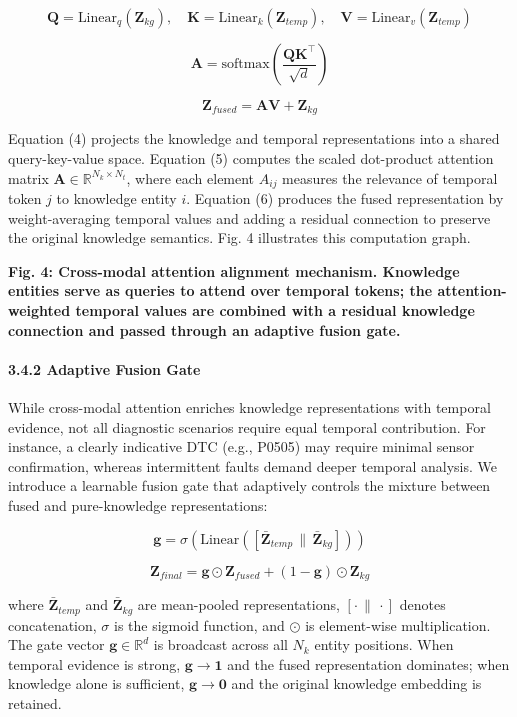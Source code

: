 \documentclass[
  11pt,
]{article}
\begin{document}
\[ \mathbf{Q} = \text{Linear}_q(\mathbf{Z}_{kg}), \quad \mathbf{K} = \text{Linear}_k(\mathbf{Z}_{temp}), \quad \mathbf{V} = \text{Linear}_v(\mathbf{Z}_{temp}) \tag{4} \]

\[ \mathbf{A} = \text{softmax}\left(\frac{\mathbf{Q}\mathbf{K}^\top}{\sqrt{d}}\right) \tag{5} \]

\[ \mathbf{Z}_{fused} = \mathbf{A}\mathbf{V} + \mathbf{Z}_{kg} \tag{6} \]

Equation (4) projects the knowledge and temporal representations into a
shared query-key-value space. Equation (5) computes the scaled
dot-product attention matrix
\(\mathbf{A} \in \mathbb{R}^{N_k \times N_t}\), where each element
\(A_{ij}\) measures the relevance of temporal token \(j\) to knowledge
entity \(i\). Equation (6) produces the fused representation by
weight-averaging temporal values and adding a residual connection to
preserve the original knowledge semantics. Fig. 4 illustrates this
computation graph.

\textbf{Fig. 4: Cross-modal attention alignment mechanism. Knowledge
entities serve as queries to attend over temporal tokens; the
attention-weighted temporal values are combined with a residual
knowledge connection and passed through an adaptive fusion gate.}

\paragraph{3.4.2 Adaptive Fusion Gate}\label{adaptive-fusion-gate}

While cross-modal attention enriches knowledge representations with
temporal evidence, not all diagnostic scenarios require equal temporal
contribution. For instance, a clearly indicative DTC (e.g., P0505) may
require minimal sensor confirmation, whereas intermittent faults demand
deeper temporal analysis. We introduce a learnable fusion gate that
adaptively controls the mixture between fused and pure-knowledge
representations:

\[ \mathbf{g} = \sigma\left(\text{Linear}\left([\bar{\mathbf{Z}}_{temp} \,\|\, \bar{\mathbf{Z}}_{kg}]\right)\right) \tag{7} \]

\[ \mathbf{Z}_{final} = \mathbf{g} \odot \mathbf{Z}_{fused} + (1 - \mathbf{g}) \odot \mathbf{Z}_{kg} \tag{8} \]

where \(\bar{\mathbf{Z}}_{temp}\) and \(\bar{\mathbf{Z}}_{kg}\) are
mean-pooled representations, \([\cdot \,\|\, \cdot]\) denotes
concatenation, \(\sigma\) is the sigmoid function, and \(\odot\) is
element-wise multiplication. The gate vector
\(\mathbf{g} \in \mathbb{R}^d\) is broadcast across all \(N_k\) entity
positions. When temporal evidence is strong,
\(\mathbf{g} \rightarrow \mathbf{1}\) and the fused representation
dominates; when knowledge alone is sufficient,
\(\mathbf{g} \rightarrow \mathbf{0}\) and the original knowledge
embedding is retained.
\end{document}
